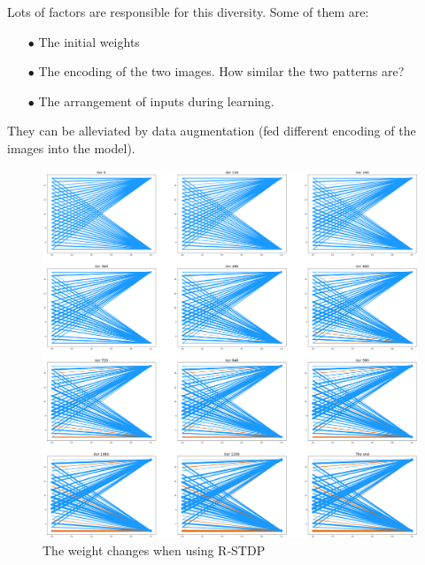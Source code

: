 \documentclass{article}
\begin{document}
	Lots of factors are responsible for this diversity. Some of them are:
	\begin{itemize}
		\item[$\bullet$] The initial weights
		\item[$\bullet$] The encoding of the two images. How similar the two patterns are?
		\item[$\bullet$] The arrangement of inputs during learning.
	\end{itemize}
	They can be alleviated by data augmentation (fed different encoding of the images into the model).
	\begin{figure}[h]
		\includegraphics[width=\textwidth]{rstdp_weight1.png}
		\caption{The weight changes when using R-STDP}
		\label{fig:wr1}
	\end{figure}
	
\end{document}
